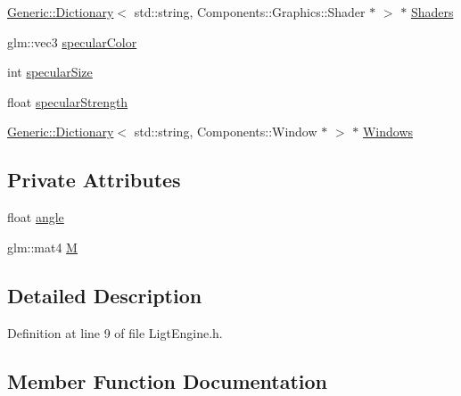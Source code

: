 \begin{DoxyCompactItemize}
\item 
\mbox{\hyperlink{classGeneric_1_1Dictionary}{Generic\+::\+Dictionary}}$<$ std\+::string, Components\+::\+Graphics\+::\+Shader $\ast$ $>$ $\ast$ \mbox{\hyperlink{classEngine_1_1BaseEngine_a2582dee3f73da82bb422b43317b85e3b}{Shaders}}
\item 
glm\+::vec3 \mbox{\hyperlink{classApplication_1_1Engines_1_1LightEngine_ae03347f7ed935e951726dffba52d0fef}{specular\+Color}}
\item 
int \mbox{\hyperlink{classApplication_1_1Engines_1_1LightEngine_a5da28beed5c8d278c3615974d464f246}{specular\+Size}}
\item 
float \mbox{\hyperlink{classApplication_1_1Engines_1_1LightEngine_a97dc7516071da727bcbb137e0cb75301}{specular\+Strength}}
\item 
\mbox{\hyperlink{classGeneric_1_1Dictionary}{Generic\+::\+Dictionary}}$<$ std\+::string, Components\+::\+Window $\ast$ $>$ $\ast$ \mbox{\hyperlink{classEngine_1_1BaseEngine_a4a1a4c4dae052e66ecc4f326eeed4d33}{Windows}}
\end{DoxyCompactItemize}
\subsection*{Private Attributes}
\begin{DoxyCompactItemize}
\item 
float \mbox{\hyperlink{classApplication_1_1Engines_1_1LightEngine_ad729a37b02875c824d6bd2c8630a4520}{angle}}
\item 
glm\+::mat4 \mbox{\hyperlink{classApplication_1_1Engines_1_1LightEngine_ae9cca787b2b0d5d4dbcc3c63afa196e1}{M}}
\end{DoxyCompactItemize}


\subsection{Detailed Description}


Definition at line 9 of file Ligt\+Engine.\+h.



\subsection{Member Function Documentation}
\mbox{\label{classEngine_1_1BaseEngine_acd5cd5d2189d24e038b23477b7dce405}} 
